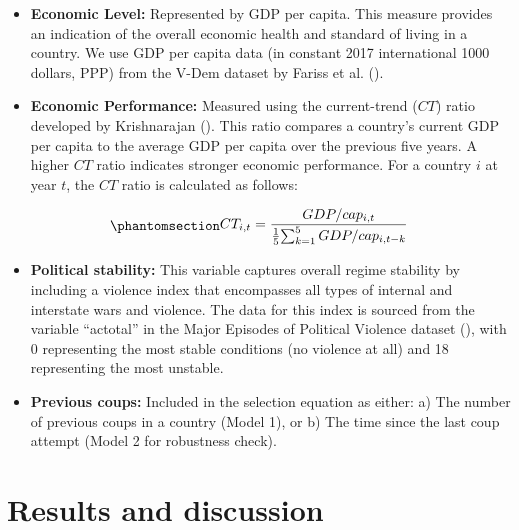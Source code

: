 \documentclass[
  12pt,
]{report}
\providecommand{\tightlist}{%
  \setlength{\itemsep}{0pt}\setlength{\parskip}{0pt}}\usepackage{longtable,booktabs,array}
\begin{document}
\begin{itemize}
\tightlist
\item
  \textbf{Economic Level:} Represented by GDP per capita. This measure
  provides an indication of the overall economic health and standard of
  living in a country. We use GDP per capita data (in constant 2017
  international 1000 dollars, PPP) from the V-Dem dataset by Fariss et
  al. ().
\item
  \textbf{Economic Performance:} Measured using the current-trend
  (\(CT\)) ratio developed by Krishnarajan
  (). This ratio compares a
  country's current GDP per capita to the average GDP per capita over
  the previous five years. A higher \(CT\) ratio indicates stronger
  economic performance. For a country \(i\) at year \(t\), the \(CT\)
  ratio is calculated as follows:
\end{itemize}

\begin{equation}\phantomsection\label{eq-eq6}{
    \begin{aligned}
    CT_{i,t} = {GDP/cap_{i,t} \over {1 \over 5} {\sum_{k=1}^5GDP/cap_{i,t-k}}}
    \end{aligned}
}\end{equation}

\begin{itemize}
\tightlist
\item
  \textbf{Political stability:} This variable captures overall regime
  stability by including a violence index that encompasses all types of
  internal and interstate wars and violence. The data for this index is
  sourced from the variable ``actotal'' in the Major Episodes of
  Political Violence dataset
  (), with 0
  representing the most stable conditions (no violence at all) and 18
  representing the most unstable.
\item
  \textbf{Previous coups:} Included in the selection equation as either:
  a) The number of previous coups in a country (Model 1), or b) The time
  since the last coup attempt (Model 2 for robustness check).
\end{itemize}

\section{Results and discussion}\label{results-and-discussion}
\end{document}

